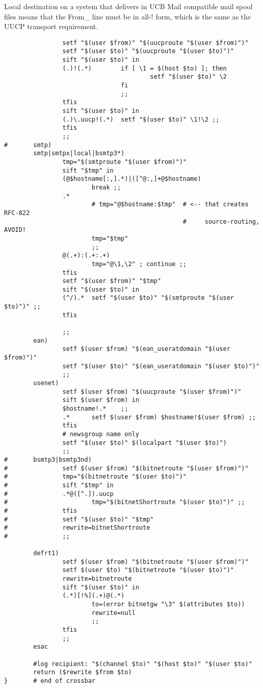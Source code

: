 Local destination on a system that delivers in UCB Mail
compatible mail spool files means that the From\_ line
must be in all-! form, which is the same as the UUCP
transport requirement.
\begin{verbatim}
                setf "$(user $from)" "$(uucproute "$(user $from)")"
                setf "$(user $to)" "$(uucproute "$(user $to)")"
                sift "$(user $to)" in
                (.)!(.*)        if [ \1 = $(host $to) ]; then
                                        setf "$(user $to)" \2
                                fi
                                ;;
                tfis
                sift "$(user $to)" in
                (.)\.uucp!(.*)  setf "$(user $to)" \1!\2 ;;
                tfis
                ;;
#       smtp)
        smtp|smtpx|local|bsmtp3*)
                tmp="$(smtproute "$(user $from)")"
                sift "$tmp" in
                (@$hostname[:,].*)|([^@:,]+@$hostname)
                        break ;;
                .*
                        # tmp="@$hostname:$tmp"  # <-- that creates RFC-822
                                                 #     source-routing, AVOID!
                        tmp="$tmp"
                        ;;
                @(.+):(.+:.+)
                        tmp="@\1,\2" ; continue ;;
                tfis
                setf "$(user $from)" "$tmp"
                sift "$(user $to)" in
                (^/).*  setf "$(user $to)" "$(smtproute "$(user $to)")" ;;
                tfis

                ;;
        ean)    
                setf $(user $from) "$(ean_useratdomain "$(user $from)")"
                setf "$(user $to)" "$(ean_useratdomain "$(user $to)")"
                ;;
        usenet)
                setf $(user $from) "$(uucproute "$(user $from)")"
                sift $(user $from) in
                $hostname!.*    ;;
                .*      setf $(user $from) $hostname!$(user $from) ;;
                tfis
                # newsgroup name only
                setf "$(user $to)" $(localpart "$(user $to)")
                ;;
#       bsmtp3|bsmtp3nd)
#               setf $(user $from) "$(bitnetroute "$(user $from)")"
#               tmp="$(bitnetroute "$(user $to)")"
#               sift "$tmp" in
#               .*@([^.]).uucp
#                       tmp="$(bitnetShortroute "$(user $to)")" ;;
#               tfis
#               setf "$(user $to)" "$tmp"
#               rewrite=bitnetShortroute
#               ;;

        defrt1)
                setf $(user $from) "$(bitnetroute "$(user $from)")"
                setf $(user $to) "$(bitnetroute "$(user $to)")"
                rewrite=bitnetroute
                sift "$(user $to)" in
                (.*)[!%](.+)@(.*)
                        to=(error bitnetgw "\3" $(attributes $to))
                        rewrite=null
                        ;;
                tfis
                ;;
        esac

        #log recipient: "$(channel $to)" "$(host $to)" "$(user $to)"
        return ($rewrite $from $to)
}       # end of crossbar
\end{verbatim}



